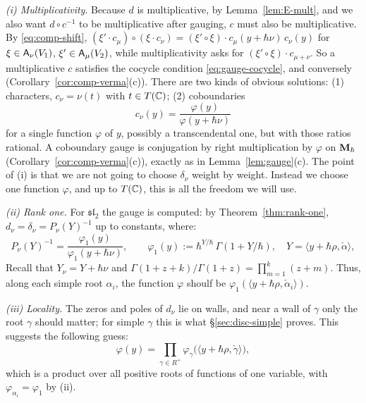 \documentclass{article}
\theoremstyle{plain}
\theoremstyle{definition}
\theoremstyle{remark}
\numberwithin{equation}{section}
\begin{document}
\emph{(i) Multiplicativity}. Because $d$ is multiplicative, by Lemma~\ref{lem:E-mult}, and we also want  $d\circ c^{-1}$ to be multiplicative after gauging, $c$ must also be multiplicative. By \eqref{eq:comp-shift}, $(\xi'\cdot c_\mu)\circ(\xi\cdot c_\nu)=(\xi'\circ\xi)\cdot c_\mu(y+\hbar\nu)\,c_\nu(y)$ for $\xi\in\mathsf A_\nu(V_1)$, $\xi'\in\mathsf A_\mu(V_2)$, while multiplicativity asks for $(\xi'\circ\xi)\cdot c_{\mu+\nu}$. So a multiplicative $c$ satisfies the cocycle condition \eqref{eq:gauge-cocycle}, and conversely (Corollary~\ref{cor:comp-verma}(c)). There are two kinds of obvious solutions: (1) characters, $c_\nu=\nu(t)$ with $t\in T(\mathbb{C})$; (2) coboundaries
\[
c_\nu(y)=\frac{\varphi(y)}{\varphi(y+\hbar\nu)}
\]
for a single function $\varphi$ of $y$, possibly a transcendental one, but with those ratios rational. A coboundary gauge is conjugation by right multiplication by $\varphi$ on $\mathbf{M}_\hbar$ (Corollary~\ref{cor:comp-verma}(c)), exactly as in Lemma~\ref{lem:gauge}(c). The point of (i) is that we are not going to choose $\delta_\nu$ weight by weight. Instead we choose one function $\varphi$, and up to $T(\mathbb{C})$, this is all the freedom we will use.

\emph{(ii) Rank one.} For $\mathfrak{sl}_2$ the gauge is computed: by Theorem~\ref{thm:rank-one}, $d_\nu=\delta_\nu=P_\nu(Y)^{-1}$ up to constants, where:
\[
P_\nu(Y)^{-1}=\frac{\varphi_1(y)}{\varphi_1(y+\hbar\nu)},\qquad \varphi_1(y):=\hbar^{Y/\hbar}\,\Gamma(1+Y/\hbar),\quad Y=\langle y+\hbar\rho,\check\alpha\rangle,
\]
Recall that $Y_\nu=Y+\hbar\nu$ and $\Gamma(1+z+k)/\Gamma(1+z)=\prod_{m=1}^k(z+m)$. Thus, along each simple root $\alpha_i$, the function $\varphi$ shoulf be $\varphi_1(\langle y+\hbar\rho,\check\alpha_i\rangle)$.

\emph{(iii) Locality.} The zeros and poles of $d_\nu$ lie on walls, and near a wall of $\gamma$ only the root $\gamma$ should matter; for simple $\gamma$ this is what \S\ref{sec:disc-simple} proves. This suggests the following guess:
\[
\varphi(y)=\prod_{\gamma\in R^+}\varphi_\gamma\bigl(\langle y+\hbar\rho,\check\gamma\rangle\bigr),
\]
which is a product over all positive roots of functions of one variable, with $\varphi_{\alpha_i}=\varphi_1$ by (ii).
\end{document}
